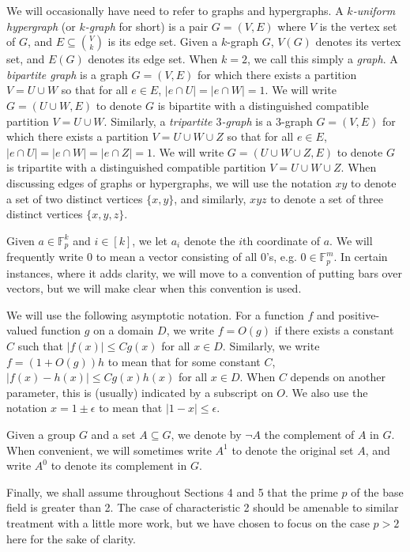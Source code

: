 \documentclass[12pt,oneside,british,a4wide]{amsart}
\numberwithin{equation}{section}
\theoremstyle{definition}
\def\F{\mathbb{F}}
\def\e{\epsilon}
\begin{document}
We will occasionally have need to refer to graphs and hypergraphs.  A \emph{$k$-uniform hypergraph} (or \emph{$k$-graph} for short) is a pair $G=(V,E)$ where $V$ is the vertex set of $G$, and $E\subseteq {V\choose k}$ is its edge set.  Given a $k$-graph $G$, $V(G)$ denotes its vertex set, and $E(G)$ denotes its edge set. When $k=2$, we call this simply a \emph{graph}.  A \emph{bipartite graph} is a graph $G=(V,E)$ for which there exists a partition $V=U\cup W$ so that for all $e\in E$, $|e\cap U|= |e\cap W|=1$.  We will write $G=(U\cup W, E)$ to denote $G$ is bipartite with a distinguished compatible partition $V=U\cup W$.  Similarly, a \emph{tripartite $3$-graph} is a $3$-graph $G=(V,E)$ for which there exists a partition $V=U\cup W\cup Z$ so that for all $e\in E$, $|e\cap U|= |e\cap W|=|e\cap Z|=1$.  We will write $G=(U\cup W\cup Z, E)$ to denote $G$ is tripartite with a distinguished compatible partition $V=U\cup W\cup Z$.  When discussing edges of graphs or hypergraphs, we will use the notation $xy$ to denote a set of two distinct vertices $\{x,y\}$, and similarly, $xyz$ to denote a set of three distinct vertices $\{x,y,z\}$.

Given $a\in \F_p^k$ and $i\in [k]$, we let $a_i$ denote the $i$th coordinate of $a$.  We will frequently write $0$ to mean a vector consisting of all $0$'s, e.g. $0\in \F_p^m$.  In certain instances, where it adds clarity,  we will move to a convention of putting bars over vectors, but we will make clear when this convention is used.

We will use the following asymptotic notation. For a function $f$ and positive-valued function $g$ on a domain $D$, we write $f = O(g)$ if there exists a constant $C$ such that $|f(x)| \leq Cg(x)$ for all $x\in D$.  Similarly, we write $f=(1+O(g))h$ to mean that  for some constant $C$, $|f(x)-h(x)|\leq Cg(x)h(x)$ for all $x\in D$. When $C$ depends on another parameter, this is (usually) indicated by a subscript on $O$. We also use the notation $x=1\pm \e$ to mean that $|1-x|\leq \e$.

Given a group $G$ and a set $A\subseteq G$, we denote by $\neg A$ the complement of $A$ in $G$.  When convenient, we will sometimes write $A^1$ to denote the original set $A$, and write $A^0$ to denote its complement in $G$.

Finally, we shall assume throughout Sections 4 and 5 that the prime $p$ of the base field is greater than 2. The case of characteristic 2 should be amenable to similar treatment with a little more work, but we have chosen to focus on the case $p>2$ here for the sake of clarity.
\end{document}
